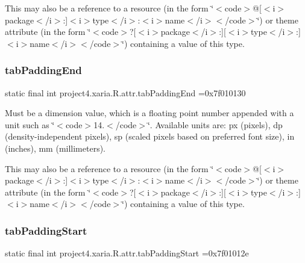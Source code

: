 This may also be a reference to a resource (in the form \char`\"{}$<$code$>$@\mbox{[}$<$i$>$package$<$/i$>$\+:\mbox{]}$<$i$>$type$<$/i$>$\+:$<$i$>$name$<$/i$>$$<$/code$>$\char`\"{}) or theme attribute (in the form \char`\"{}$<$code$>$?\mbox{[}$<$i$>$package$<$/i$>$\+:\mbox{]}\mbox{[}$<$i$>$type$<$/i$>$\+:\mbox{]}$<$i$>$name$<$/i$>$$<$/code$>$\char`\"{}) containing a value of this type. \mbox{\label{classproject4_1_1xaria_1_1R_1_1attr_a9b6c0bdb46a2e4a4cdc0cf097a7c48c1}} 
\subsubsection{\texorpdfstring{tab\+Padding\+End}{tabPaddingEnd}}
{\footnotesize\ttfamily static final int project4.\+xaria.\+R.\+attr.\+tab\+Padding\+End =0x7f010130\hspace{0.3cm}{\ttfamily [static]}}

Must be a dimension value, which is a floating point number appended with a unit such as \char`\"{}$<$code$>$14.\+5sp$<$/code$>$\char`\"{}. Available units are\+: px (pixels), dp (density-\/independent pixels), sp (scaled pixels based on preferred font size), in (inches), mm (millimeters). 

This may also be a reference to a resource (in the form \char`\"{}$<$code$>$@\mbox{[}$<$i$>$package$<$/i$>$\+:\mbox{]}$<$i$>$type$<$/i$>$\+:$<$i$>$name$<$/i$>$$<$/code$>$\char`\"{}) or theme attribute (in the form \char`\"{}$<$code$>$?\mbox{[}$<$i$>$package$<$/i$>$\+:\mbox{]}\mbox{[}$<$i$>$type$<$/i$>$\+:\mbox{]}$<$i$>$name$<$/i$>$$<$/code$>$\char`\"{}) containing a value of this type. \mbox{\label{classproject4_1_1xaria_1_1R_1_1attr_afff2b8cb331f39ea74f2f06b14fab5b1}} 
\subsubsection{\texorpdfstring{tab\+Padding\+Start}{tabPaddingStart}}
{\footnotesize\ttfamily static final int project4.\+xaria.\+R.\+attr.\+tab\+Padding\+Start =0x7f01012e\hspace{0.3cm}{\ttfamily [static]}}

